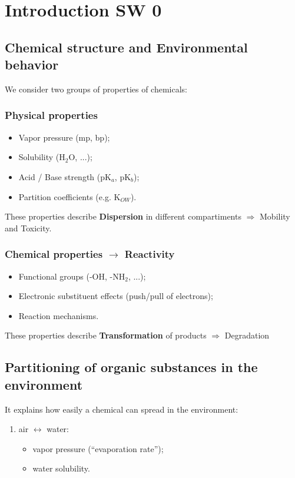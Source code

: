 \documentclass{article}
\begin{document}
\section{Introduction SW 0}
\subsection{Chemical structure and Environmental behavior}
We consider two groups of properties of chemicals:
\subsubsection{Physical properties}
\begin{itemize}
    \item Vapor pressure (mp, bp);
    \item Solubility (H$_2$O, ...);
    \item Acid / Base strength (pK$_a$, pK$_b$);
    \item Partition coefficients (e.g. K$_{OW}$).
\end{itemize}

These properties describe \textbf{Dispersion} in different compartiments $\Rightarrow$ Mobility and Toxicity.

\subsubsection{Chemical properties $\rightarrow$ Reactivity}
\begin{itemize}
    \item Functional groups (-OH, -NH$_2$, ...);
    \item Electronic substituent effects (push/pull of electrons);
    \item Reaction mechanisms.
\end{itemize}

These properties describe \textbf{Transformation} of products $\Rightarrow$ Degradation

\subsection{Partitioning of organic substances in the environment}
It explains how easily a chemical can spread in the environment:
\begin{enumerate}
    \item air $\leftrightarrow$ water:
        \begin{itemize}
            \item vapor pressure (``evaporation rate'');
            \item water solubility.
        \end{itemize}
\end{enumerate}
\end{document}
